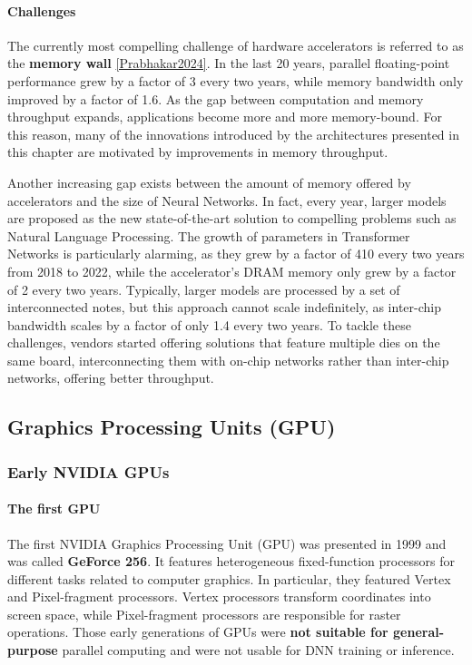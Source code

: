\documentclass[conference]{IEEEtran}
\begin{document}
\paragraph{Challenges}
The currently most compelling challenge of hardware accelerators is referred to as the \textbf{memory wall} \ref{Prabhakar2024}. In the last 20 years, parallel floating-point performance grew by a factor of 3 every two years, while memory bandwidth only improved by a factor of 1.6. As the gap between computation and memory throughput expands, applications become more and more memory-bound. For this reason, many of the innovations introduced by the architectures presented in this chapter are motivated by improvements in memory throughput.

Another increasing gap exists between the amount of memory offered by accelerators and the size of Neural Networks. In fact, every year, larger models are proposed as the new state-of-the-art solution to compelling problems such as Natural Language Processing. The growth of parameters in Transformer Networks is particularly alarming, as they grew by a factor of 410 every two years from 2018 to 2022, while the accelerator's DRAM memory only grew by a factor of 2 every two years. Typically, larger models are processed by a set of interconnected notes, but this approach cannot scale indefinitely, as inter-chip bandwidth scales by a factor of only 1.4 every two years.
To tackle these challenges, vendors started offering solutions that feature multiple dies on the same board, interconnecting them with on-chip networks rather than inter-chip networks, offering better throughput.

 
\subsection{Graphics Processing Units (GPU)} \label{gpu}
\subsubsection{Early NVIDIA GPUs}
\label{gpu1}
\paragraph{The first GPU}
The first NVIDIA Graphics Processing Unit (GPU) was presented in 1999 and was called \textbf{GeForce 256}. It features heterogeneous fixed-function processors for different tasks related to computer graphics. In particular, they featured Vertex and Pixel-fragment processors. Vertex processors transform coordinates into screen space, while Pixel-fragment processors are responsible for raster operations. Those early generations of GPUs were \textbf{not suitable for general-purpose} parallel computing and were not usable for DNN training or inference.
\end{document}
